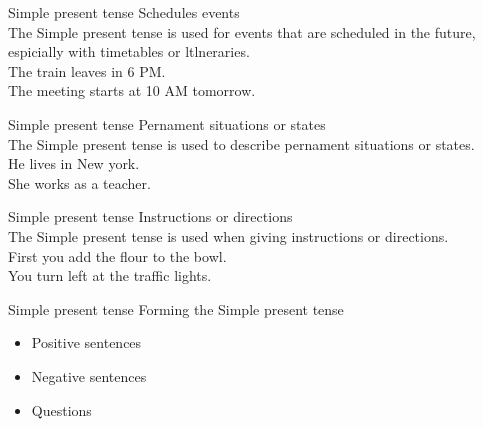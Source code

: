 \documentclass{beamer}
\begin{document}
\begin{frame}{Simple present tense}
\centering
Schedules events\\
\vspace{0.2in}
The Simple present tense is used for events that are scheduled in the future, espicially with timetables or ltlneraries.\\
\vspace{0.2in}
The train leaves in 6 PM.\\
The meeting starts at 10 AM tomorrow.\\    
\end{frame}
\begin{frame}{Simple present tense}
\centering
Pernament situations or states\\
\vspace{0.2in}
The Simple present tense is used to describe pernament situations or states.\\
\vspace{0.2in}
He lives in New york.\\
She works as a teacher.    
\end{frame}

\begin{frame}{Simple present tense}
\centering
Instructions or directions\\
\vspace{0.2in}
The Simple present tense is used when giving instructions or directions.\\
\vspace{0.2in}
First you add the flour to the bowl.\\
You turn left at the traffic lights.\\    
\end{frame}    

\begin{frame}{Simple present tense}
\centering
Forming the Simple present tense\\
\vspace{0.3in}
\begin{itemize}
\item [$\rightarrow$]Positive sentences
\item[$\rightarrow$]Negative sentences
\item [$\rightarrow$]Questions    
\end{itemize}
\end{frame}
\end{document}
